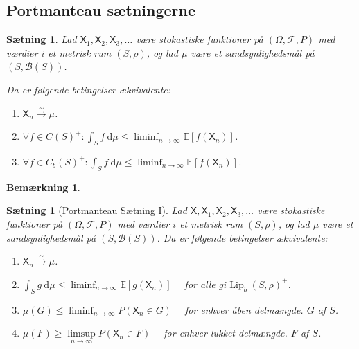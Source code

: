 \documentclass{article}
\newcommand{\1}{\mathbbm{1}}
\newcommand{\X}{\mathsf{X}}
\theoremstyle{boxed}
\newtheorem{remark}[theorem]{Bemærkning}
\newtheorem{proposition}[theorem]{Sætning}
\begin{document}
\subsection{Portmanteau sætningerne}
\begin{theorem-box}
    \begin{proposition}
        Lad $\X_1, \X_2, \X_3, \ldots$ være stokastiske funktioner på $(\Omega, \mathcal{F}, P)$ med værdier $i$ et metrisk rum $(S, \rho)$, og lad $\mu$ være et sandsynlighedsmål på $(S, \mathcal{B}(S))$.

Da er følgende betingelser ækvivalente:
\begin{enumerate}
    \item[\textnormal{(i)}] $\X_n \xrightarrow{\sim} \mu$.
    \item[\textnormal{(ii)}] $\forall f \in C(S)^{+}: \int_S f \mathrm{~d} \mu \leq \liminf _{n \rightarrow \infty} \mathbb{E}\left[f\left(\X_n\right)\right]$.
    \item[\textnormal{(iii)}] $\forall f \in C_b(S)^{+}: \int_S f \mathrm{~d} \mu \leq \liminf _{n \rightarrow \infty} \mathbb{E}\left[f\left(\X_n\right)\right]$.
\end{enumerate}
    \end{proposition}
\end{theorem-box}
\begin{remark}
\end{remark}
\begin{theorem-box}
\begin{proposition}[Portmanteau Sætning I]
    Lad $\X, \X_1, \X_2, \X_3, \ldots$ være stokastiske funktioner på $(\Omega, \mathcal{F}, P)$ med værdier $i$ et metrisk rum $(S, \rho)$, og lad $\mu$ være et sandsynlighedsmål på $(S, \mathcal{B}(S))$.
    Da er følgende betingelser ækvivalente:
    \begin{enumerate}
        \item[\textnormal{(i)}] $\X_n \xrightarrow{\sim} \mu$.
        \item[\textnormal{(ii)}] $\int_S g \mathrm{~d} \mu \leq \liminf _{n \rightarrow \infty} \mathbb{E}\left[g\left(\X_n\right)\right] \quad$ for alle $g i \operatorname{Lip}_b(S, \rho)^{+}$.
        \item[\textnormal{(iii)}]$\mu(G) \leq \liminf _{n \rightarrow \infty} P\left(\X_n \in G\right) \quad$ for enhver åben delmængde. $G$ af $S$.
        \item[\textnormal{(iv)}] $\mu(F) \geq \underset{n \rightarrow \infty}{\limsup } P\left(\X_n \in F\right) \quad$ for enhver lukket delmængde. $F$ af $S$.
    \end{enumerate}
\end{proposition}
\end{theorem-box}
\end{document}
